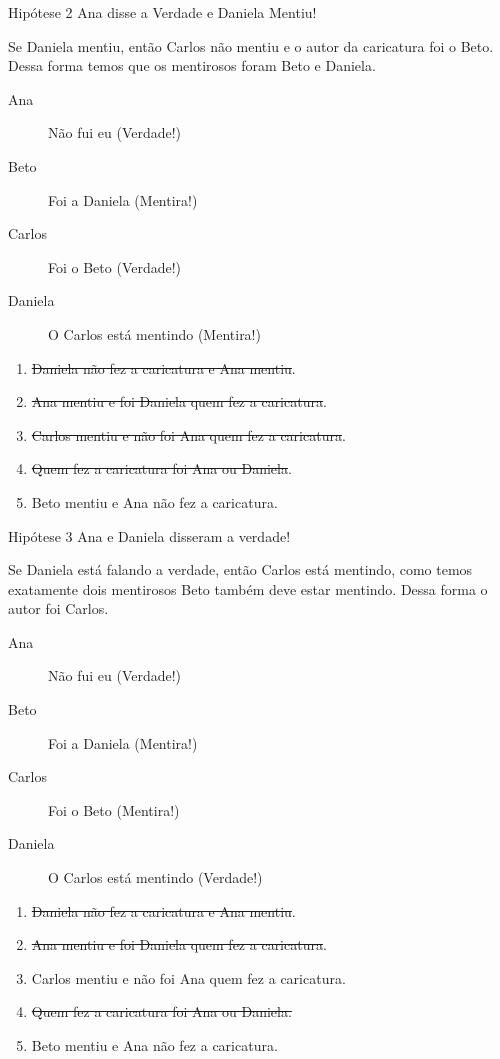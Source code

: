\documentclass[10pt,aspectratio=169]{beamer}
\begin{document}
\begin{frame}[t]
	\begin{resultado}{Hipótese 2}
		Ana disse a Verdade e Daniela Mentiu!
	\end{resultado}
	Se Daniela mentiu, então Carlos não mentiu e o autor da caricatura foi o Beto. Dessa forma temos que os mentirosos foram Beto e Daniela.
	\begin{description}
		\item[Ana] Não fui eu \alert{(Verdade!)}
		\item[Beto] Foi a Daniela \alert{(Mentira!)}
		\item[Carlos] Foi o Beto \alert{(Verdade!)}
		\item[Daniela] O Carlos está mentindo \alert{(Mentira!)}
	\end{description}
	\hrulefill
	\begin{enumerate}[a]
		\item \sout{Daniela não fez a caricatura e Ana mentiu}.
		\item \sout{Ana mentiu e foi Daniela quem fez a caricatura}.
		\item \sout{Carlos mentiu e não foi Ana quem fez a caricatura}.
		\item \sout{Quem fez a caricatura foi Ana ou Daniela}.
		\item Beto mentiu e Ana não fez a caricatura.
	\end{enumerate}
\end{frame}

\begin{frame}[t]
	\begin{resultado}{Hipótese 3}
 		Ana e Daniela disseram a verdade!
	\end{resultado}
	Se Daniela está falando a verdade, então Carlos está mentindo, como temos exatamente dois mentirosos Beto também deve estar mentindo. Dessa forma o autor foi Carlos.
	\begin{description}
		\item[Ana] Não fui eu \alert{(Verdade!)}
		\item[Beto] Foi a Daniela \alert{(Mentira!)}
		\item[Carlos] Foi o Beto \alert{(Mentira!)}
		\item[Daniela] O Carlos está mentindo \alert{(Verdade!)}
	\end{description}
	\hrulefill
	\begin{enumerate}[a]
		\item \sout{Daniela não fez a caricatura e Ana mentiu}.
		\item \sout{Ana mentiu e foi Daniela quem fez a caricatura}.
		\item Carlos mentiu e não foi Ana quem fez a caricatura.
		\item \sout{Quem fez a caricatura foi Ana ou Daniela.}
		\item Beto mentiu e Ana não fez a caricatura.
	\end{enumerate}
\end{frame}
\end{document}
